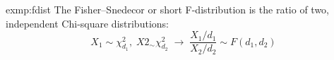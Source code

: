 \begin{exmp}[F-distribution]{exmp:fdist}
	The Fisher–Snedecor or short F-distribution is the ratio of two, independent Chi-square distributions:
	\begin{equation*}
	X_1\sim \chi^2_{d_1},\;	X2_\sim \chi^2_{d_2}\;\rightarrow\;\frac{X_1/d_1}{X_2/d_2}\sim F(d_1,d_2)
	\end{equation*}
	
\end{exmp}
